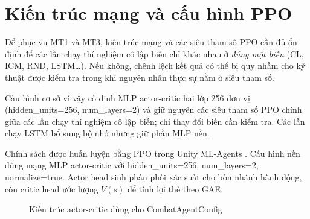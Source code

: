 \section{Kiến trúc mạng và cấu hình PPO}

Để phục vụ MT1 và MT3, kiến trúc mạng và các siêu tham số PPO cần đủ ổn định để các lần chạy thí nghiệm cô lập biến chỉ khác nhau ở \emph{đúng một biến} (CL, ICM, RND, LSTM\dots). Nếu không, chênh lệch kết quả có thể bị quy nhầm cho kỹ thuật được kiểm tra trong khi nguyên nhân thực sự nằm ở siêu tham số.

Cấu hình cơ sở vì vậy cố định MLP actor-critic hai lớp 256 đơn vị (hidden\_units=256, num\_layers=2) và giữ nguyên các siêu tham số PPO chính giữa các lần chạy thí nghiệm cô lập biến; chỉ thay đổi biến cần kiểm tra. Các lần chạy LSTM bổ sung bộ nhớ nhưng giữ phần MLP nền.

Chính sách được huấn luyện bằng PPO trong Unity ML-Agents \cite{Juliani2018}. Cấu hình nền dùng mạng MLP actor-critic với hidden\_units=256, num\_layers=2, normalize=true. Actor head sinh phân phối xác suất cho bốn nhánh hành động, còn critic head ước lượng $V(s)$ để tính lợi thế theo GAE.

\begin{figure}[H]
    \centering
    \caption{Kiến trúc actor-critic dùng cho CombatAgentConfig}
    \label{fig:actor_critic_architecture}
\end{figure}

